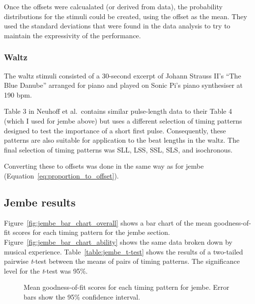 \documentclass[12pt,twoside,openright]{report}
\begin{document}
Once the offsets were calcualated (or derived from data), the probability distributions for the stimuli could be created, using the offset as the mean. They used the standard deviations that were found in the data analysis to try to maintain the expressivity of the performance.

\subsubsection{Waltz} \label{waltz_stimuli}

The waltz stimuli consisted of a 30-second excerpt of Johann Strauss II's ``The
Blue Danube'' arranged for piano and played on Sonic Pi's piano synthesiser at
190 bpm.

Table 3 in Neuhoff et al.\ contains similar
pulse-length data to their Table 4 (which I used for jembe above) but uses a different
selection of timing patterns designed to test the importance of a short first
pulse. Consequently, these patterns are also suitable for application to the
beat lengths in the waltz. The final selection of timing patterns was SLL, LSS,
SSL, SLS, and isochronous.

Converting these to offsets was done in the same way as for jembe (Equation~\ref{eq:proportion_to_offset}).


\subsection{Jembe results} \label{user_study_jembe_results}

Figure~\ref{fig:jembe_bar_chart_overall} shows a bar chart of the mean goodness-of-fit scores for each timing
pattern for the jembe section. Figure~\ref{fig:jembe_bar_chart_ability} shows the same data broken down by
musical experience. Table~\ref{table:jembe_t-test} shows the results of a two-tailed pairwise \textit{t}-test between the means of pairs of timing patterns. The significance level for the \textit{t}-test was 95\%.

\begin{figure}[ht]
    \centering
    \caption{Mean goodness-of-fit scores for each timing pattern for jembe. Error bars show the 95\% confidence interval.}
    \label{fig:jembe_bar_charts}
\end{figure}
\end{document}
